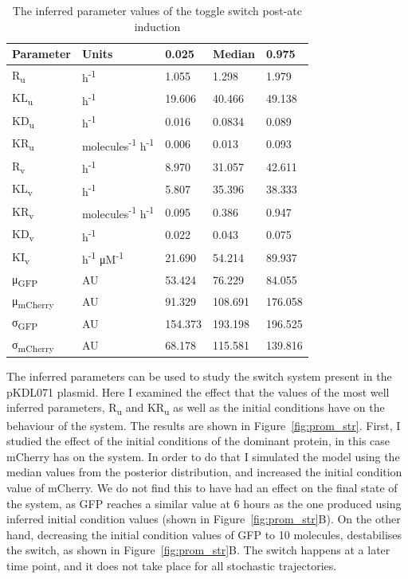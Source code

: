 \begin{table}[htb]
\centering
\caption{The inferred parameter values of the toggle switch post-\acrshort{atc} induction}
\label{tab:inf_params_atc}
\begin{tabular}{@{}lllll@{}}
\toprule
Parameter & Units &0.025 & Median & 0.975 \\ \midrule
R\textsubscript{u} & h\textsuperscript{-1}& 1.055 & 1.298 & 1.979 \\
KL\textsubscript{u} &h\textsuperscript{-1}& 19.606 & 40.466 & 49.138 \\
KD\textsubscript{u} &h\textsuperscript{-1}& 0.016 & 0.0834 & 0.089 \\
KR\textsubscript{u} &molecules\textsuperscript{-1} h\textsuperscript{-1}& 0.006 & 0.013 & 0.093 \\
R\textsubscript{v} & h\textsuperscript{-1}& 8.970 & 31.057 & 42.611 \\
KL\textsubscript{v} &h\textsuperscript{-1}& 5.807 & 35.396 & 38.333 \\
KR\textsubscript{v} &molecules\textsuperscript{-1} h\textsuperscript{-1}& 0.095 & 0.386 & 0.947 \\
KD\textsubscript{v} &h\textsuperscript{-1}& 0.022 & 0.043 & 0.075 \\
KI\textsubscript{v} &h\textsuperscript{-1} μM\textsuperscript{-1}& 21.690 & 54.214 & 89.937 \\
μ\textsubscript{GFP} &AU& 53.424 & 76.229 & 84.055 \\
μ\textsubscript{mCherry} &AU& 91.329 & 108.691 & 176.058 \\
σ\textsubscript{GFP} &AU& 154.373 & 193.198 & 196.525 \\
σ\textsubscript{mCherry} &AU& 68.178 & 115.581 & 139.816 \\ \bottomrule
\end{tabular}
\end{table}

The inferred parameters can be used to study the switch system present in the pKDL071 plasmid. Here I examined the effect that the values of the most well inferred parameters, R\textsubscript{u} and KR\textsubscript{u} as well as the initial conditions have on the behaviour of the system. The results are shown in Figure~\ref{fig:prom_str}. First, I studied the effect of the initial conditions of the dominant protein, in this case mCherry has on the system. In order to do that I simulated the model using the median values from the posterior distribution, and increased the initial condition value of mCherry. We do not find this to have had an effect on the final state of the system, as GFP reaches a similar value at 6 hours as the one produced using inferred initial condition values (shown in Figure~\ref{fig:prom_str}B). On the other hand, decreasing the initial condition values of GFP to 10 molecules, destabilises the switch, as shown in Figure~\ref{fig:prom_str}B. The switch happens at a later time point, and it does not take place for all stochastic trajectories.   

